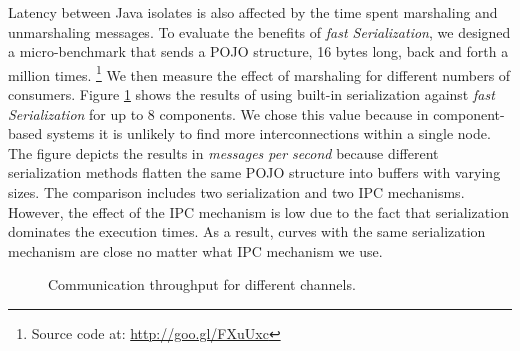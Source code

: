 Latency between Java isolates is also affected by the time spent marshaling and unmarshaling messages.
To evaluate the benefits of \textit{fast Serialization}, we designed a micro-benchmark that sends a POJO structure, 16 bytes long, back and forth a million times. \footnote{Source code at: \url{http://goo.gl/FXuUxc}}
We then measure the effect of marshaling for different numbers of consumers.
Figure \ref{fig:multicast-communication} shows the results of using built-in serialization against \textit{fast Serialization} for up to 8 components.
We chose this value because in component-based systems it is unlikely to find more interconnections within a single node.
The figure depicts the results in \textit{messages per second} because different serialization methods flatten the same POJO structure into buffers with varying sizes.
The comparison includes two serialization and two IPC mechanisms.
However, the effect of the IPC mechanism is low due to the fact that serialization dominates the execution times.
As a result, curves with the same serialization mechanism are close no matter what IPC mechanism we use.

\begin{figure}
\centering

\caption{Communication throughput for different channels.}
\label{fig:multicast-communication}
\vspace{-0.5cm}
\end{figure}


